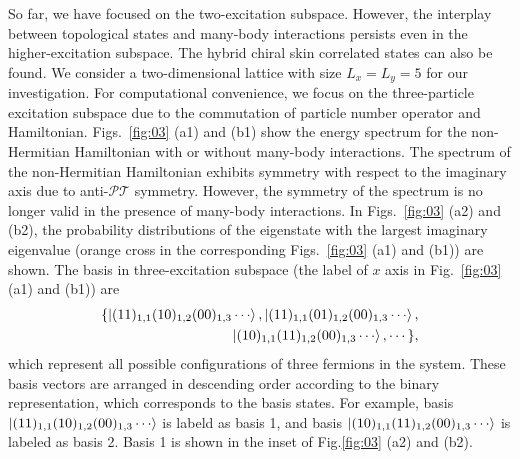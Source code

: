 \documentclass[longbibliography, aps, prx, amsmath, amssymb, amsfonts, twocolumn,superscriptaddress, footinbib]{revtex4-1}
\begin{document}
	So far, we have focused on the two-excitation subspace. However, the interplay between topological states and many-body interactions persists even in the higher-excitation subspace. The hybrid chiral skin correlated states can also be found. 
	We consider a two-dimensional lattice with size $L_x = L_y = 5$ for our investigation. For computational convenience, we focus on the three-particle excitation subspace due to the commutation of particle number operator and Hamiltonian. 
	Figs.~\ref{fig:03} (a1) and (b1) show the energy spectrum
	for the non-Hermitian Hamiltonian with or without many-body interactions. 
	The spectrum of the non-Hermitian Hamiltonian exhibits symmetry with respect to the imaginary axis due to anti-$\mathcal{PT}$ symmetry. However, the symmetry of the spectrum is no longer valid in the presence of many-body interactions. 
	In Figs.~\ref{fig:03} (a2) and (b2), the probability distributions of the eigenstate with the largest imaginary eigenvalue (orange cross in the corresponding Figs.~\ref{fig:03} (a1) and (b1)) are shown.
	The basis in three-excitation subspace (the label of $x$ axis in Fig.~\ref{fig:03} (a1) and (b1)) are
	\begin{equation}
		\begin{split}
		\{\ket{(11)_{1,1}(10)_{1,2}(00)_{1,3}\cdots}, \ket{(11)_{1,1}(01)_{1,2}(00)_{1,3}\cdots}, \\
		\ket{(10)_{1,1}(11)_{1,2}(00)_{1,3}\cdots},\cdots\}, 
		\end{split}
	\end{equation}
	which represent all possible configurations of three fermions in the system. These basis vectors are arranged in descending order according to the binary representation, which corresponds to the basis states. For example, basis $\ket{(11)_{1,1}(10)_{1,2}(00)_{1,3}\cdots}$ is labeld as basis 1, and basis $\ket{(10)_{1,1}(11)_{1,2}(00)_{1,3}\cdots}$ is labeled as basis 2. Basis 1 is shown in the inset of Fig.\ref{fig:03} (a2) and (b2). 
\end{document}

